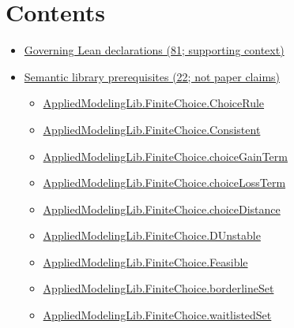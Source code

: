 \documentclass[10pt]{article}
\begin{document}
\section*{Contents}
\begin{itemize}[leftmargin=1.2em]
\item \hyperlink{governing-declaration-section-5ef5ef0364b6939c}{Governing Lean declarations (81; supporting context)}
\item \hyperlink{library-section-bee5354f1438f98f}{Semantic library prerequisites (22; not paper claims)}
\begin{itemize}[leftmargin=1.2em]
\item \hyperlink{library-prerequisite-5dea5c3766008208}{Applied\allowbreak{}Modeling\allowbreak{}Lib.\allowbreak{}Finite\allowbreak{}Choice.\allowbreak{}Choice\allowbreak{}Rule}
\item \hyperlink{library-prerequisite-be6c13aaea04fe91}{Applied\allowbreak{}Modeling\allowbreak{}Lib.\allowbreak{}Finite\allowbreak{}Choice.\allowbreak{}Consistent}
\item \hyperlink{library-prerequisite-05fecda83056eed7}{Applied\allowbreak{}Modeling\allowbreak{}Lib.\allowbreak{}Finite\allowbreak{}Choice.\allowbreak{}choice\allowbreak{}Gain\allowbreak{}Term}
\item \hyperlink{library-prerequisite-e80e92c8b3b09d11}{Applied\allowbreak{}Modeling\allowbreak{}Lib.\allowbreak{}Finite\allowbreak{}Choice.\allowbreak{}choice\allowbreak{}Loss\allowbreak{}Term}
\item \hyperlink{library-prerequisite-e6cfa04e2407529a}{Applied\allowbreak{}Modeling\allowbreak{}Lib.\allowbreak{}Finite\allowbreak{}Choice.\allowbreak{}choice\allowbreak{}Distance}
\item \hyperlink{library-prerequisite-6cea78f6cd82039c}{Applied\allowbreak{}Modeling\allowbreak{}Lib.\allowbreak{}Finite\allowbreak{}Choice.\allowbreak{}D\allowbreak{}Unstable}
\item \hyperlink{library-prerequisite-e24a27bd29c81560}{Applied\allowbreak{}Modeling\allowbreak{}Lib.\allowbreak{}Finite\allowbreak{}Choice.\allowbreak{}Feasible}
\item \hyperlink{library-prerequisite-5ba6bdc0420301d7}{Applied\allowbreak{}Modeling\allowbreak{}Lib.\allowbreak{}Finite\allowbreak{}Choice.\allowbreak{}borderline\allowbreak{}Set}
\item \hyperlink{library-prerequisite-d9f59540dae57de5}{Applied\allowbreak{}Modeling\allowbreak{}Lib.\allowbreak{}Finite\allowbreak{}Choice.\allowbreak{}waitlisted\allowbreak{}Set}

\end{itemize}
\end{itemize}
\end{document}
